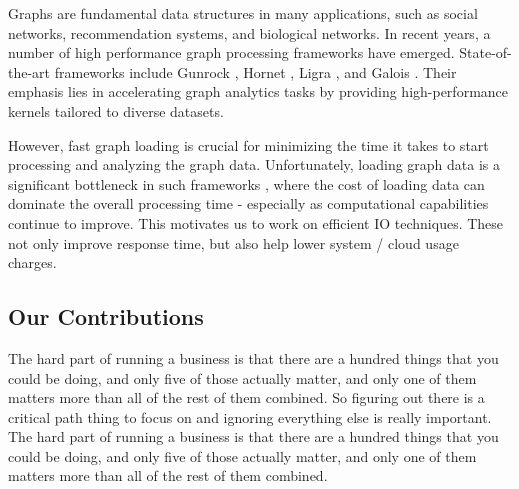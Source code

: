 Graphs are fundamental data structures in many applications, such as social networks, recommendation systems, and biological networks. In recent years, a number of high performance graph processing frameworks have emerged. State-of-the-art frameworks include Gunrock \cite{wang2016gunrock}, Hornet \cite{busato2018hornet}, Ligra \cite{shun2013ligra}, and Galois \cite{nguyen2013lightweight}. Their emphasis lies in accelerating graph analytics tasks by providing high-performance kernels tailored to diverse datasets.

However, fast graph loading is crucial for minimizing the time it takes to start processing and analyzing the graph data. Unfortunately, loading graph data is a significant bottleneck in such frameworks \cite{gabert2021pigo}, where the cost of loading data can dominate the overall processing time - especially as computational capabilities continue to improve. This motivates us to work on efficient IO techniques. These not only improve response time, but also help lower system / cloud usage charges.




\subsection{Our Contributions}

The hard part of running a business is that there are a hundred things that you could be doing, and only five of those actually matter, and only one of them matters more than all of the rest of them combined. So figuring out there is a critical path thing to focus on and ignoring everything else is really important. The hard part of running a business is that there are a hundred things that you could be doing, and only five of those actually matter, and only one of them matters more than all of the rest of them combined.



